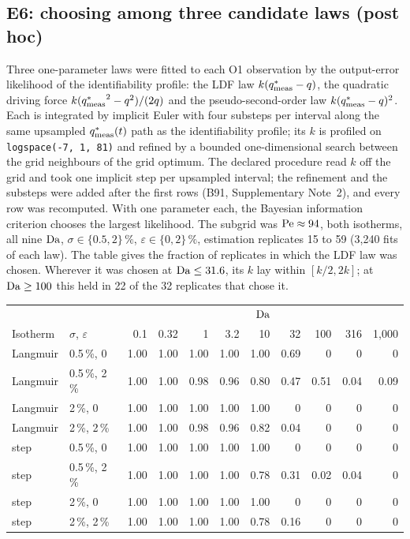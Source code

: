 \subsection*{E6: choosing among three candidate laws (post hoc)}
Three one-parameter laws were fitted to each O1 observation by the output-error likelihood of the
identifiability profile: the LDF law $k(q^{*}_{\mathrm{meas}} - q)$, the quadratic driving force
$k({q^{*}_{\mathrm{meas}}}^{2} - q^{2})/(2q)$ and the pseudo-second-order law $k(q^{*}_{\mathrm{meas}} - q)^{2}$. Each is integrated
by implicit Euler with four substeps per interval along the same upsampled $q^{*}_{\mathrm{meas}}(t)$ path as the
identifiability profile; its $k$ is profiled on \texttt{logspace(-7, 1, 81)} and refined by a
bounded one-dimensional search between the grid neighbours of the grid optimum. The declared
procedure read $k$ off the grid and took one implicit step per upsampled interval; the refinement and the substeps were
added after the first rows (B91, Supplementary Note~2), and every row was recomputed. With one
parameter each, the Bayesian information criterion chooses the largest likelihood. The subgrid
was $\mathrm{Pe} \approx 94$, both isotherms, all nine $\mathrm{Da}$, $\sigma \in \{0.5, 2\}\,\%$,
$\varepsilon \in \{0, 2\}\,\%$, estimation replicates 15 to 59 (3,240 fits of each law). The
table gives the fraction of replicates in which the LDF law was chosen. Wherever it was chosen at
$\mathrm{Da} \le 31.6$, its $k$ lay within $[k/2, 2k]$; at $\mathrm{Da} \ge 100$ this held in 22 of the 32
replicates that chose it.
\begin{center}
\small
\begin{tabular}{@{}llrrrrrrrrr@{}}
\toprule
& & \multicolumn{9}{c}{$\mathrm{Da}$} \\
Isotherm & $\sigma$, $\varepsilon$ & 0.1 & 0.32 & 1 & 3.2 & 10 & 32 & 100 & 316 & 1,000 \\
\midrule
Langmuir & 0.5\,\%, 0 & 1.00 & 1.00 & 1.00 & 1.00 & 1.00 & 0.69 & 0 & 0 & 0 \\
Langmuir & 0.5\,\%, 2\,\% & 1.00 & 1.00 & 0.98 & 0.96 & 0.80 & 0.47 & 0.51 & 0.04 & 0.09 \\
Langmuir & 2\,\%, 0 & 1.00 & 1.00 & 1.00 & 1.00 & 1.00 & 0 & 0 & 0 & 0 \\
Langmuir & 2\,\%, 2\,\% & 1.00 & 1.00 & 0.98 & 0.96 & 0.82 & 0.04 & 0 & 0 & 0 \\
step & 0.5\,\%, 0 & 1.00 & 1.00 & 1.00 & 1.00 & 1.00 & 0 & 0 & 0 & 0 \\
step & 0.5\,\%, 2\,\% & 1.00 & 1.00 & 1.00 & 1.00 & 0.78 & 0.31 & 0.02 & 0.04 & 0 \\
step & 2\,\%, 0 & 1.00 & 1.00 & 1.00 & 1.00 & 1.00 & 0 & 0 & 0 & 0 \\
step & 2\,\%, 2\,\% & 1.00 & 1.00 & 1.00 & 1.00 & 0.78 & 0.16 & 0 & 0 & 0 \\
\bottomrule
\end{tabular}
\end{center}

